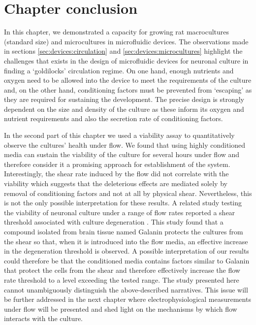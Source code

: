 \section{Chapter conclusion}
     \label{sec:devices:conclusion}
     In this chapter, we demonstrated a capacity for growing rat macrocultures (standard size) and microcultures in microfluidic devices. The observations made in sections \ref{sec:devices:circulation} and \ref{sec:devices:microcultures} highlight the challenges that exists in the design of microfluidic devices for neuronal culture in finding a `goldilocks' circulation regime. On one hand, enough nutrients and oxygen need to be allowed into the device to meet the requirements of the culture and, on the other hand, conditioning factors must be prevented from `escaping' as they are required for sustaining the development. The precise design is strongly dependent on the size and density of the culture as these inform its oxygen and nutrient requirements and also the secretion rate of conditioning factors.

     In the second part of this chapter we used a viability assay to quantitatively observe the cultures' health under flow. We found that using highly conditioned media can sustain the viability of the culture for several hours under flow and therefore consider it a promising approach for establishment of the system. Interestingly, the shear rate induced by the flow did not correlate with the viability which suggests that the deleterious effects are mediated solely by removal of conditioning factors and not at all by physical shear. Nevertheless, this is not the only possible interpretation for these results. A related study testing the viability of neuronal culture under a range of flow rates reported a shear threshold associated with culture degeneration \cite{liu2013galanin}. This study found that a compound isolated from brain tissue named Galanin protects the cultures from the shear so that, when it is introduced into the flow media, an effective increase in the degeneration threshold is observed. A possible interpretation of our results could therefore be that the conditioned media contains factors similar to Galanin that protect the cells from the shear and therefore effectively increase the flow rate threshold to a level exceeding the tested range. The study presented here cannot unambiguously distinguish the above-described narratives. This issue will be further addressed in the next chapter where electrophysiological measurements under flow will be presented and shed light on the mechanisms by which flow interacts with the culture.



